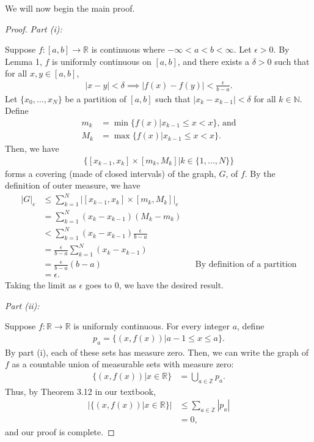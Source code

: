 \documentclass[10pt,a4paper]{article}
\makeatletter
\theoremstyle{theorem}
\newcommand{\proofpart}[2]{%
  \par
  \addvspace{\medskipamount}%
  \noindent\emph{Part #1: #2}\par\nobreak
  \addvspace{\smallskipamount}%
  \@afterheading
}
\theoremstyle{definition}
\makeatother
\begin{document}
We will now begin the main proof.
\begin{proof}
\proofpart{(i)}{}
Suppose $f:[a,b] \to \mathbb{R}$ is continuous where $-\infty < a < b < \infty$. Let $\epsilon > 0$. By Lemma 1, $f$ is uniformly continuous on $[a, b]$, and there exists a $\delta > 0$ such that for all $x, y \in [a, b]$,
\begin{align*}
|x - y| < \delta \implies |f(x) - f(y)| < \frac{\epsilon}{b - a}.
\end{align*}
Let $\{x_0, ..., x_N\}$ be a partition of $[a, b]$ such that $|x_k - x_{k-1}| < \delta$ for all $k \in \mathbb{N}$. Define 
\begin{align*}
m_k &= \min\{f(x)| x_{k-1} \leq x < x\} \text{, and}\\
M_k &= \max\{f(x)| x_{k-1} \leq x < x\}.
\end{align*}
Then, we have
\begin{align*}
\{[x_{k-1}, x_k] \times [m_k, M_k] | k \in \{1, ..., N\} \}
\end{align*}
forms a covering (made of closed intervals) of the graph, $G$, of $f$. By the definition of outer measure, we have
\begin{align*}
|G|_e &\leq \sum_{k=1}^N |[x_{k-1}, x_k] \times [m_k, M_k]|_e\\
&= \sum_{k=1}^N (x_k - x_{k - 1}) (M_k - m_k)\\
&< \sum_{k=1}^N (x_k - x_{k - 1})\frac{\epsilon}{b - a} \\
&= \frac{\epsilon}{b - a}\sum_{k=1}^N (x_k - x_{k - 1})\\
&= \frac{\epsilon}{b - a} (b - a) &&\text{By definition of a partition}\\
&= \epsilon. 
\end{align*}
Taking the limit as $\epsilon$ goes to $0$, we have the desired result.
\proofpart{(ii)}{}
Suppose $f:\mathbb{R} \to \mathbb{R}$ is uniformly continuous. For every integer $a$, define 
\begin{align*}
p_a = \{(x, f(x))| a-1 \leq x \leq a\}.
\end{align*}
By part (i), each of these sets has measure zero. Then, we can write the graph of $f$ as a countable union of measurable sets with measure zero:
\begin{align*}
\{(x, f(x)) | x \in \mathbb{R} \} &= \bigcup_{a \in \mathbb{Z}} p_a.
\end{align*}
Thus, by Theorem 3.12 in our textbook,
\begin{align*}
|\{(x, f(x) )| x \in \mathbb{R} \}| &\leq \sum_{a \in \mathbb{Z}} |p_a|\\
&= 0,
\end{align*}
and our proof is complete.
\end{proof}
\end{document}
